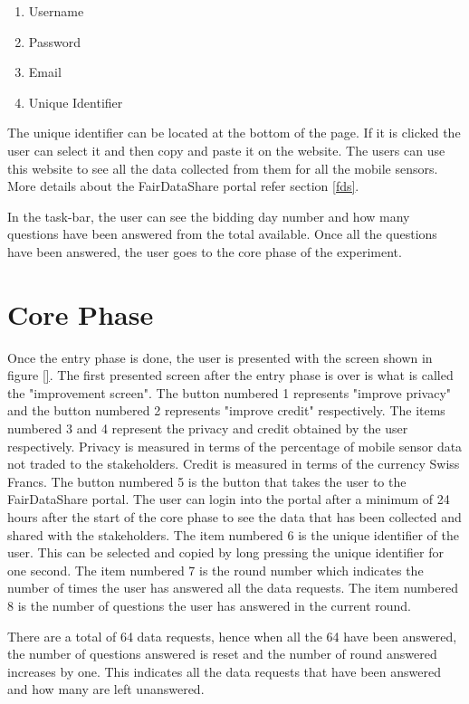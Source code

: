 \begin{enumerate}
    \item Username
    \item Password
    \item Email
    \item Unique Identifier
\end{enumerate}

The unique identifier can be located at the bottom of the page. If it is clicked the user can select it and then copy and paste it on the website.
The users can use this website to see all the data collected from them for all the mobile sensors. More details about the FairDataShare portal
refer section \ref{fds}.

In the task-bar, the user can see the bidding day number and how many questions have been answered from the total available.
Once all the questions have been answered, the user goes to the core phase of the experiment.

\section{Core Phase} \label{core}

Once the entry phase is done, the user is presented with the screen shown in figure \ref{}. The first presented screen after the entry phase is over is what is called the "improvement screen". The button numbered 1
represents "improve privacy" and the button numbered 2 represents "improve credit" respectively. The items numbered 3 and 4 represent the privacy  and credit obtained by the user respectively. Privacy is measured in terms of the percentage of mobile sensor data not traded to the stakeholders. Credit is measured in terms of the currency Swiss Francs. The button numbered 5 is the button that takes the user to the FairDataShare portal. The user can  login into the portal after a minimum of 24 hours after the start of the core phase to see the data that has been collected and shared with the stakeholders. The item numbered 6 is the unique identifier of the user. This can be selected and copied by long pressing the unique identifier for one second. The item numbered 7 is the round number which indicates the number of times the user has answered all the data requests. The item numbered 8 is the number of questions the user has answered in the current round.

There are a total of 64 data requests, hence when all the 64 have been answered, the number of questions answered is reset and the number of round answered increases by one. This indicates all the data requests that have been answered and how many are left unanswered. 

